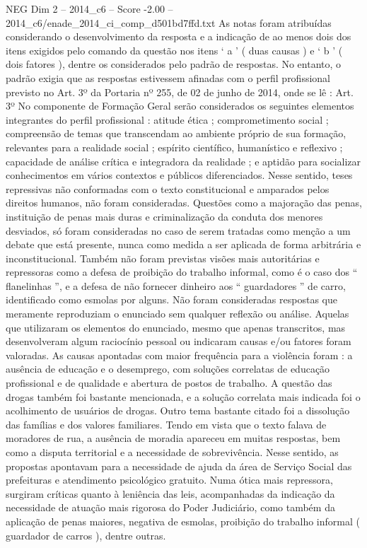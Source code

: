\begin{textsample}{NEG Dim 2 – 2014\_c6 – Score -2.00 – 2014\_c6/enade\_2014\_ci\_comp\_d501bd7ffd.txt}
As notas foram atribuídas considerando o desenvolvimento da resposta e a indicação de ao menos dois dos itens exigidos pelo comando da questão nos itens ‘ a ’ ( duas causas ) e ‘ b ’ ( dois fatores ), dentre os considerados pelo padrão de respostas.
No entanto, o padrão exigia que as respostas estivessem afinadas com o perfil profissional previsto no Art. 3º da Portaria nº 255, de 02 de junho de 2014, onde se lê : Art. 3º No componente de Formação Geral serão considerados os seguintes elementos integrantes do perfil profissional : atitude ética ; comprometimento social ; compreensão de temas que transcendam ao ambiente próprio de sua formação, relevantes para a realidade social ; espírito científico, humanístico e reflexivo ; capacidade de análise crítica e integradora da realidade ; e aptidão para socializar conhecimentos em vários contextos e públicos diferenciados.
Nesse sentido, teses repressivas não conformadas com o texto constitucional e amparados pelos direitos humanos, não foram consideradas.
Questões como a majoração das penas, instituição de penas mais duras e criminalização da conduta dos menores desviados, só foram consideradas no caso de serem tratadas como menção a um debate que está presente, nunca como medida a ser aplicada de forma arbitrária e inconstitucional.
Também não foram previstas visões mais autoritárias e repressoras como a defesa de proibição do trabalho informal, como é o caso dos “ flanelinhas ”, e a defesa de não fornecer dinheiro aos “ guardadores ” de carro, identificado como esmolas por alguns.
Não foram consideradas respostas que meramente reproduziam o enunciado sem qualquer reflexão ou análise.
Aquelas que utilizaram os elementos do enunciado, mesmo que apenas transcritos, mas desenvolveram algum raciocínio pessoal ou indicaram causas e/ou fatores foram valoradas.
As causas apontadas com maior frequência para a violência foram : a ausência de educação e o desemprego, com soluções correlatas de educação profissional e de qualidade e abertura de postos de trabalho.
A questão das drogas também foi bastante mencionada, e a solução correlata mais indicada foi o acolhimento de usuários de drogas.
Outro tema bastante citado foi a dissolução das famílias e dos valores familiares.
Tendo em vista que o texto falava de moradores de rua, a ausência de moradia apareceu em muitas respostas, bem como a disputa territorial e a necessidade de sobrevivência.
Nesse sentido, as propostas apontavam para a necessidade de ajuda da área de Serviço Social das prefeituras e atendimento psicológico gratuito.
Numa ótica mais repressora, surgiram críticas quanto à leniência das leis, acompanhadas da indicação da necessidade de atuação mais rigorosa do Poder Judiciário, como também da aplicação de penas maiores, negativa de esmolas, proibição do trabalho informal ( guardador de carros ), dentre outras.

\end{textsample}
